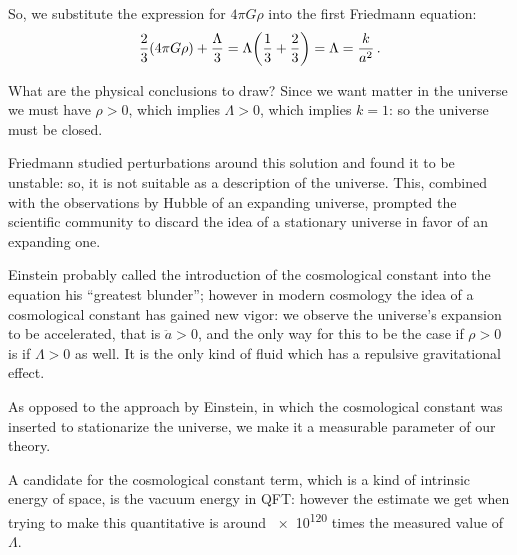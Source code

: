 \documentclass[main.tex]{subfiles}
\begin{document}
So, we substitute the expression for \(4 \pi G \rho \) into the first Friedmann equation: 
%
\begin{equation}
  \frac{2}{3} \qty(4 \pi G \rho ) + \frac{\Lambda}{3} =
  \Lambda \qty(\frac{1}{3}+ \frac{2}{3}) = \Lambda = \frac{k}{a^2}
\,.
\end{equation}

What are the physical conclusions to draw? 
Since we want matter in the universe we must have \(\rho >0\), which implies \(\Lambda >0\), which implies \(k =1\): so the universe must be closed. 

Friedmann studied perturbations around this solution and found it to be unstable: so, it is not suitable as a description of the universe.
This, combined with the observations by Hubble of an expanding universe, prompted the scientific community to discard the idea of a stationary universe in favor of an expanding one.

Einstein probably \cite{autInvestigatingLegendEinstein2018} called the introduction of the cosmological constant into the equation his ``greatest blunder''; however in modern cosmology the idea of a cosmological constant has gained new vigor: we observe the universe's expansion to be accelerated, that is \(\ddot{a} > 0\), and the only way for this to be the case if \(\rho >0\) is if \(\Lambda > 0\) as well. 
It is the only kind of fluid which has a repulsive gravitational effect.

As opposed to the approach by Einstein, in which the cosmological constant was inserted to stationarize the universe, we make it a measurable parameter of our theory.

A candidate for the cosmological constant term, which is a kind of intrinsic energy of space, is the vacuum energy in QFT: however the estimate we get when trying to make this quantitative is around \num{e120} times the measured value of \(\Lambda \).

\end{document}
